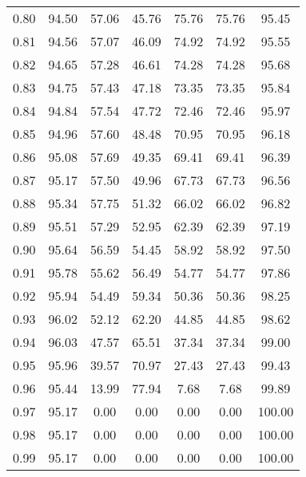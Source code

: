 \begin{tabular}{|c|c|c|c|c|c|c|}
      0.80 &     94.50 &     57.06 &      45.76 &   75.76 &      75.76 &         95.45 \\
      0.81 &     94.56 &     57.07 &      46.09 &   74.92 &      74.92 &         95.55 \\
      0.82 &     94.65 &     57.28 &      46.61 &   74.28 &      74.28 &         95.68 \\
      0.83 &     94.75 &     57.43 &      47.18 &   73.35 &      73.35 &         95.84 \\
      0.84 &     94.84 &     57.54 &      47.72 &   72.46 &      72.46 &         95.97 \\
      0.85 &     94.96 &     57.60 &      48.48 &   70.95 &      70.95 &         96.18 \\
      0.86 &     95.08 &     57.69 &      49.35 &   69.41 &      69.41 &         96.39 \\
      0.87 &     95.17 &     57.50 &      49.96 &   67.73 &      67.73 &         96.56 \\
      0.88 &     95.34 &     57.75 &      51.32 &   66.02 &      66.02 &         96.82 \\
      0.89 &     95.51 &     57.29 &      52.95 &   62.39 &      62.39 &         97.19 \\
      0.90 &     95.64 &     56.59 &      54.45 &   58.92 &      58.92 &         97.50 \\
      0.91 &     95.78 &     55.62 &      56.49 &   54.77 &      54.77 &         97.86 \\
      0.92 &     95.94 &     54.49 &      59.34 &   50.36 &      50.36 &         98.25 \\
      0.93 &     96.02 &     52.12 &      62.20 &   44.85 &      44.85 &         98.62 \\
      0.94 &     96.03 &     47.57 &      65.51 &   37.34 &      37.34 &         99.00 \\
      0.95 &     95.96 &     39.57 &      70.97 &   27.43 &      27.43 &         99.43 \\
      0.96 &     95.44 &     13.99 &      77.94 &    7.68 &       7.68 &         99.89 \\
      0.97 &     95.17 &      0.00 &       0.00 &    0.00 &       0.00 &        100.00 \\
      0.98 &     95.17 &      0.00 &       0.00 &    0.00 &       0.00 &        100.00 \\
      0.99 &     95.17 &      0.00 &       0.00 &    0.00 &       0.00 &        100.00 \\
\bottomrule
\end{tabular}
